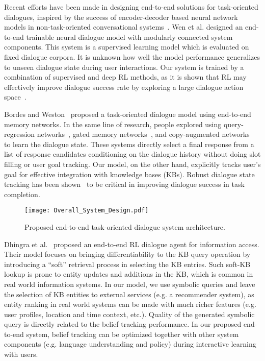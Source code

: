 \documentclass[11pt,a4paper]{article}
\begin{document}
    Recent efforts have been made in designing end-to-end solutions for task-oriented dialogues, inspired by the success of encoder-decoder based neural network models in non-task-oriented conversational systems~\cite{serban2015building,li2016persona}. Wen et al. \cite{wenN2N16} designed an end-to-end trainable neural dialogue model with modularly connected system components. This system is a supervised learning model which is evaluated on fixed dialogue corpora. It is unknown how well the model performance generalizes to unseen dialogue state during user interactions. Our system is trained by a combination of supervised and deep RL methods, as it is shown that RL may effectively improve dialogue success rate by exploring a large dialogue action space~\cite{henderson2008hybrid,li2017end}.  

    Bordes and Weston~ proposed a task-oriented dialogue model using end-to-end memory networks. In the same line of research, people explored using query-regression networks~\cite{seo2016query}, gated memory networks~\cite{liu2017gated}, and copy-augmented networks~\cite{eric2017copy} to learn the dialogue state. These systems directly select a final response from a list of response candidates conditioning on the dialogue history without doing slot filling or user goal tracking. Our model, on the other hand, explicitly tracks user's goal for effective integration with knowledge bases (KBs). Robust dialogue state tracking has been shown~\cite{jurvcivcek2012reinforcement} to be critical in improving dialogue success in task completion.

  \begin{figure*}[t]
      \centering
      \texttt{[image: Overall\_System\_Design.pdf]}
      \caption{{ Proposed end-to-end task-oriented dialogue system architecture. }}
      \label{fig:system_design}
  \end{figure*}
  
    Dhingra et al.~ proposed an end-to-end RL dialogue agent for information access. Their model focuses on bringing differentiability to the KB query operation by introducing a ``soft'' retrieval process in selecting the KB entries. Such soft-KB lookup is prone to entity updates and additions in the KB, which is common in real world information systems. In our model, we use symbolic queries and leave the selection of KB entities to external services (e.g. a recommender system), as entity ranking in real world systems can be made with much richer features (e.g. user profiles, location and time context, etc.). Quality of the generated symbolic query is directly related to the belief tracking performance. In our proposed end-to-end system, belief tracking can be optimized together with other system components (e.g. language understanding and policy) during interactive learning with users.
\end{document}
